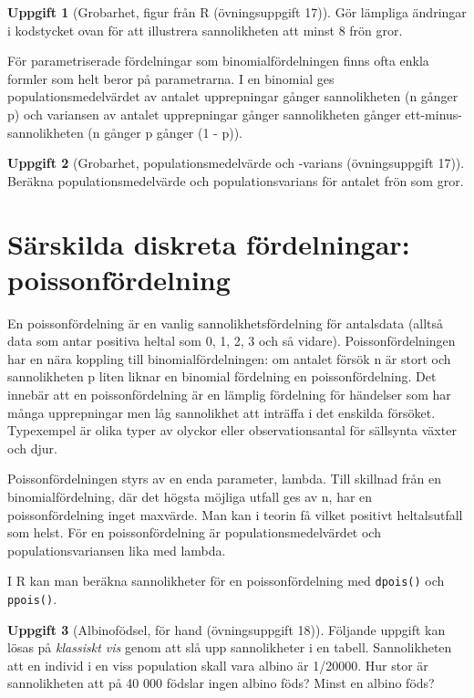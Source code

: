 \documentclass[
]{book}
\theoremstyle{definition}
\theoremstyle{definition}
\theoremstyle{definition}
\newtheorem{exercise}{Uppgift}[chapter]
\theoremstyle{definition}
\theoremstyle{remark}
\begin{document}
\begin{exercise}[Grobarhet, figur från R (övningsuppgift 17)]
Gör lämpliga ändringar i kodstycket ovan för att illustrera sannolikheten att minst 8 frön gror.
\end{exercise}

För parametriserade fördelningar som binomialfördelningen finns ofta enkla formler som helt beror på parametrarna. I en binomial ges populationsmedelvärdet av antalet upprepningar gånger sannolikheten (n gånger p) och variansen av antalet upprepningar gånger sannolikheten gånger ett-minus-sannolikheten (n gånger p gånger (1 - p)).

\begin{exercise}[Grobarhet, populationsmedelvärde och -varians (övningsuppgift 17)]
Beräkna populationsmedelvärde och populationsvarians för antalet frön som gror.
\end{exercise}

\hypertarget{suxe4rskilda-diskreta-fuxf6rdelningar-poissonfuxf6rdelning}{%
\section{Särskilda diskreta fördelningar: poissonfördelning}\label{suxe4rskilda-diskreta-fuxf6rdelningar-poissonfuxf6rdelning}}

En poissonfördelning är en vanlig sannolikhetsfördelning för antalsdata (alltså data som antar positiva heltal som 0, 1, 2, 3 och så vidare). Poissonfördelningen har en nära koppling till binomialfördelningen: om antalet försök n är stort och sannolikheten p liten liknar en binomial fördelning en poissonfördelning. Det innebär att en poissonfördelning är en lämplig fördelning för händelser som har många upprepningar men låg sannolikhet att inträffa i det enskilda försöket. Typexempel är olika typer av olyckor eller observationsantal för sällsynta växter och djur.

Poissonfördelningen styrs av en enda parameter, lambda. Till skillnad från en binomialfördelning, där det högsta möjliga utfall ges av n, har en poissonfördelning inget maxvärde. Man kan i teorin få vilket positivt heltalsutfall som helst. För en poissonfördelning är populationsmedelvärdet och populationsvariansen lika med lambda.

I R kan man beräkna sannolikheter för en poissonfördelning med \texttt{dpois()} och \texttt{ppois()}.

\begin{exercise}[Albinofödsel, för hand (övningsuppgift 18)]
Följande uppgift kan lösas på \emph{klassiskt vis} genom att slå upp sannolikheter i en tabell.
Sannolikheten att en individ i en viss population skall vara albino är 1/20000.
Hur stor är sannolikheten att på 40 000 födslar ingen albino föds? Minst en albino föds?
\end{exercise}
\end{document}
